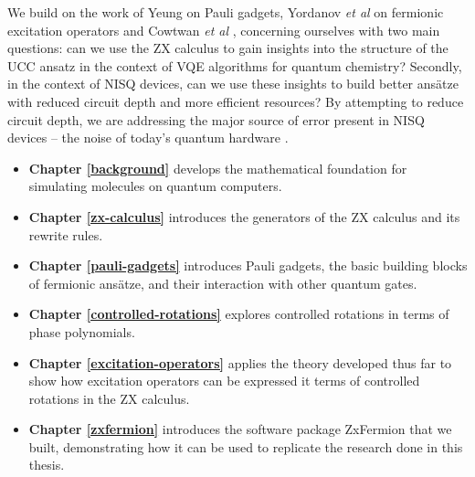 We build on the work of Yeung \cite{Yeung2020} on Pauli gadgets, Yordanov \textit{et al} \cite{Yordanov2020} on fermionic excitation operators and Cowtwan \textit{et al} \cite{Cowtan2020}, concerning ourselves with two main questions: can we use the ZX calculus to gain insights into the structure of the UCC ansatz in the context of VQE algorithms for quantum chemistry? Secondly, in the context of NISQ devices, can we use these insights to build better ansätze with reduced circuit depth and more efficient resources? By attempting to reduce circuit depth, we are addressing the major source of error present in NISQ devices -- the noise of today's quantum hardware \cite{Cowtan2020}.

\begin{itemize}
    \item \textbf{Chapter \ref{background}} develops the mathematical foundation for simulating molecules on quantum computers.
    \item \textbf{Chapter \ref{zx-calculus}} introduces the generators of the ZX calculus and its rewrite rules.
    \item \textbf{Chapter \ref{pauli-gadgets}} introduces Pauli gadgets, the basic building blocks of fermionic ansätze, and their interaction with other quantum gates.
    \item \textbf{Chapter \ref{controlled-rotations}} explores controlled rotations in terms of phase polynomials.
    \item \textbf{Chapter \ref{excitation-operators}} applies the theory developed thus far to show how excitation operators can be expressed it terms of controlled rotations in the ZX calculus.
    \item \textbf{Chapter \ref{zxfermion}} introduces the software package ZxFermion that we built, demonstrating how it can be used to replicate the research done in this thesis.
\end{itemize}
